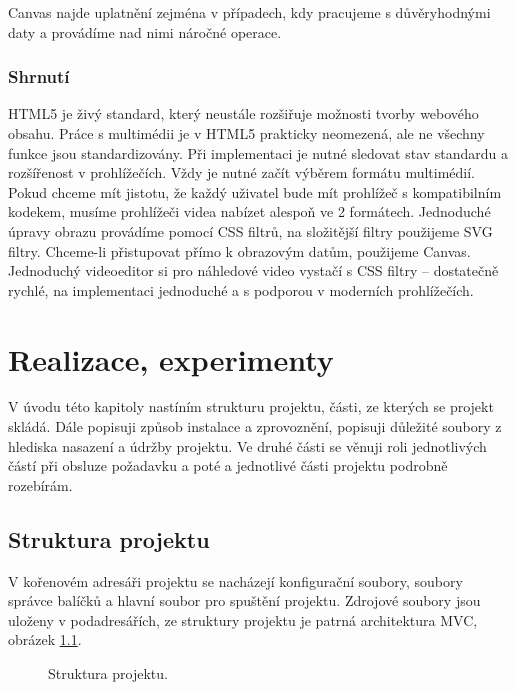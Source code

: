 Canvas najde uplatnění zejména v případech, kdy pracujeme s důvěryhodnými daty a provádíme nad nimi náročné operace. 

\subsection{Shrnutí}
HTML5 je živý standard, který neustále rozšiřuje možnosti tvorby webového obsahu. Práce s multimédii je v HTML5 prakticky neomezená, ale ne všechny funkce jsou standardizovány. Při implementaci je nutné sledovat stav standardu a rozšířenost v prohlížečích. Vždy je nutné začít výběrem formátu multimédií. Pokud chceme mít jistotu, že každý uživatel bude mít prohlížeč s kompatibilním kodekem, musíme prohlížeči videa nabízet alespoň ve 2 formátech. Jednoduché úpravy obrazu provádíme pomocí CSS filtrů, na složitější filtry použijeme SVG filtry. Chceme-li přistupovat přímo k obrazovým datům, použijeme Canvas. Jednoduchý videoeditor si pro náhledové video vystačí s CSS filtry -- dostatečně rychlé, na implementaci jednoduché a s podporou v moderních prohlížečích.

\chapter{Realizace, experimenty}
V úvodu této kapitoly nastíním strukturu projektu, části, ze kterých se projekt skládá. Dále popisuji způsob instalace a zprovoznění, popisuji důležité soubory z hlediska nasazení a údržby projektu. Ve druhé části se věnuji roli jednotlivých částí při obsluze požadavku a poté a jednotlivé části projektu podrobně rozebírám.

\section{Struktura projektu}
V kořenovém adresáři projektu se nacházejí konfigurační soubory, soubory správce balíčků a hlavní soubor pro spuštění projektu. Zdrojové soubory jsou uloženy v podadresářích, ze struktury projektu je patrná architektura MVC, obrázek \ref{img:structure}.
\begin{figure}[h]
	\centering
	\caption{Struktura projektu.}\label{img:structure}
\end{figure}

